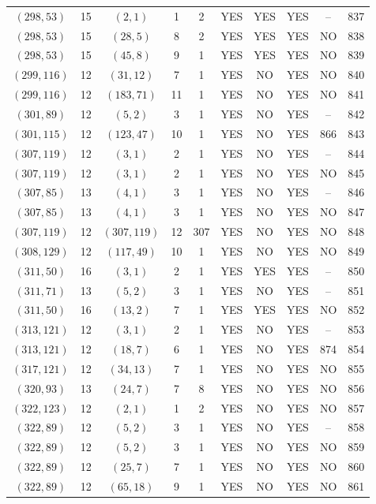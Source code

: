 \begin{longtable}{|c|c|c|c|c|c|c|c|c|c|}
$(298, 53)$ & 15 & $(2, 1)$ & 1 & 2 & YES & YES & YES & -- & 837\\
$(298, 53)$ & 15 & $(28, 5)$ & 8 & 2 & YES & YES & YES & NO & 838\\
$(298, 53)$ & 15 & $(45, 8)$ & 9 & 1 & YES & YES & YES & NO & 839\\
$(299, 116)$ & 12 & $(31, 12)$ & 7 & 1 & YES & NO & YES & NO & 840\\
$(299, 116)$ & 12 & $(183, 71)$ & 11 & 1 & YES & NO & YES & NO & 841\\
$(301, 89)$ & 12 & $(5, 2)$ & 3 & 1 & YES & NO & YES & -- & 842\\
$(301, 115)$ & 12 & $(123, 47)$ & 10 & 1 & YES & NO & YES & 866 & 843\\
$(307, 119)$ & 12 & $(3, 1)$ & 2 & 1 & YES & NO & YES & -- & 844\\
$(307, 119)$ & 12 & $(3, 1)$ & 2 & 1 & YES & NO & YES & NO & 845\\
$(307, 85)$ & 13 & $(4, 1)$ & 3 & 1 & YES & NO & YES & -- & 846\\
$(307, 85)$ & 13 & $(4, 1)$ & 3 & 1 & YES & NO & YES & NO & 847\\
$(307, 119)$ & 12 & $(307, 119)$ & 12 & 307 & YES & NO & YES & NO & 848\\
$(308, 129)$ & 12 & $(117, 49)$ & 10 & 1 & YES & NO & YES & NO & 849\\
$(311, 50)$ & 16 & $(3, 1)$ & 2 & 1 & YES & YES & YES & -- & 850\\
$(311, 71)$ & 13 & $(5, 2)$ & 3 & 1 & YES & NO & YES & -- & 851\\
$(311, 50)$ & 16 & $(13, 2)$ & 7 & 1 & YES & YES & YES & NO & 852\\
$(313, 121)$ & 12 & $(3, 1)$ & 2 & 1 & YES & NO & YES & -- & 853\\
$(313, 121)$ & 12 & $(18, 7)$ & 6 & 1 & YES & NO & YES & 874 & 854\\
$(317, 121)$ & 12 & $(34, 13)$ & 7 & 1 & YES & NO & YES & NO & 855\\
$(320, 93)$ & 13 & $(24, 7)$ & 7 & 8 & YES & NO & YES & NO & 856\\
$(322, 123)$ & 12 & $(2, 1)$ & 1 & 2 & YES & NO & YES & NO & 857\\
$(322, 89)$ & 12 & $(5, 2)$ & 3 & 1 & YES & NO & YES & -- & 858\\
$(322, 89)$ & 12 & $(5, 2)$ & 3 & 1 & YES & NO & YES & NO & 859\\
$(322, 89)$ & 12 & $(25, 7)$ & 7 & 1 & YES & NO & YES & NO & 860\\
$(322, 89)$ & 12 & $(65, 18)$ & 9 & 1 & YES & NO & YES & NO & 861\\

\end{longtable}
